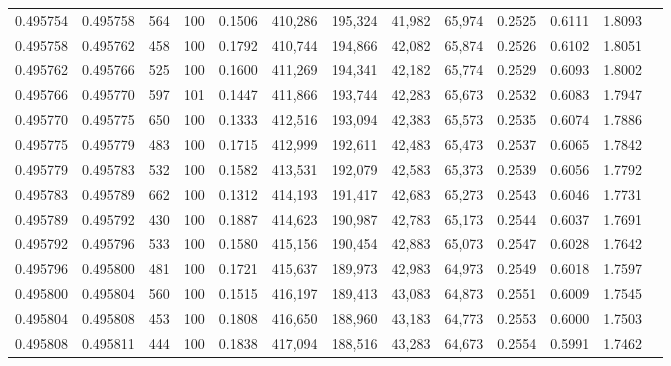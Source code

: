 \begin{tabular}{rrrrrrrrrrrrr}
0.495754 & 0.495758 &   564 & 100 &                                     0.1506 & 410,286 & 195,324 &  41,982 &  65,974 & 0.2525 & 0.6111 & 1.8093 \\
0.495758 & 0.495762 &   458 & 100 &                                     0.1792 & 410,744 & 194,866 &  42,082 &  65,874 & 0.2526 & 0.6102 & 1.8051 \\
0.495762 & 0.495766 &   525 & 100 &                                     0.1600 & 411,269 & 194,341 &  42,182 &  65,774 & 0.2529 & 0.6093 & 1.8002 \\
0.495766 & 0.495770 &   597 & 101 &                                     0.1447 & 411,866 & 193,744 &  42,283 &  65,673 & 0.2532 & 0.6083 & 1.7947 \\
0.495770 & 0.495775 &   650 & 100 &                                     0.1333 & 412,516 & 193,094 &  42,383 &  65,573 & 0.2535 & 0.6074 & 1.7886 \\
0.495775 & 0.495779 &   483 & 100 &                                     0.1715 & 412,999 & 192,611 &  42,483 &  65,473 & 0.2537 & 0.6065 & 1.7842 \\
0.495779 & 0.495783 &   532 & 100 &                                     0.1582 & 413,531 & 192,079 &  42,583 &  65,373 & 0.2539 & 0.6056 & 1.7792 \\
0.495783 & 0.495789 &   662 & 100 &                                     0.1312 & 414,193 & 191,417 &  42,683 &  65,273 & 0.2543 & 0.6046 & 1.7731 \\
0.495789 & 0.495792 &   430 & 100 &                                     0.1887 & 414,623 & 190,987 &  42,783 &  65,173 & 0.2544 & 0.6037 & 1.7691 \\
0.495792 & 0.495796 &   533 & 100 &                                     0.1580 & 415,156 & 190,454 &  42,883 &  65,073 & 0.2547 & 0.6028 & 1.7642 \\
0.495796 & 0.495800 &   481 & 100 &                                     0.1721 & 415,637 & 189,973 &  42,983 &  64,973 & 0.2549 & 0.6018 & 1.7597 \\
0.495800 & 0.495804 &   560 & 100 &                                     0.1515 & 416,197 & 189,413 &  43,083 &  64,873 & 0.2551 & 0.6009 & 1.7545 \\
0.495804 & 0.495808 &   453 & 100 &                                     0.1808 & 416,650 & 188,960 &  43,183 &  64,773 & 0.2553 & 0.6000 & 1.7503 \\
0.495808 & 0.495811 &   444 & 100 &                                     0.1838 & 417,094 & 188,516 &  43,283 &  64,673 & 0.2554 & 0.5991 & 1.7462 \\

\end{tabular}
